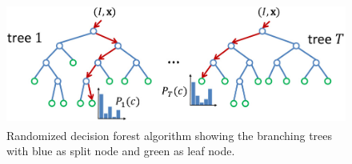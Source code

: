 \begin{figure}
	[h] \centering 
	\includegraphics[height=4cm]{figures/content/ni-decision.jpg} \caption{Randomized decision forest algorithm showing the branching trees with blue as split node and green as leaf node. \cite{13}} \label{fg:ni:decision} 
\end{figure}

